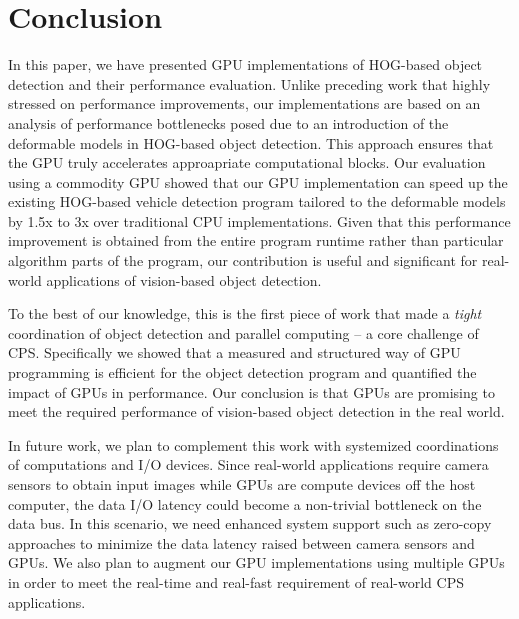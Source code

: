 \section{Conclusion}
\label{sec:conclusion}

In this paper, we have presented GPU implementations of HOG-based object
detection and their performance evaluation.
Unlike preceding work that highly stressed on performance improvements,
our implementations are based on an analysis of performance bottlenecks
posed due to an introduction of the deformable models in HOG-based
object detection.
This approach ensures that the GPU truly accelerates approapriate
computational blocks.
Our evaluation using a commodity GPU showed that our GPU implementation
can speed up the existing HOG-based vehicle detection program tailored
to the deformable models by 1.5x to 3x over traditional CPU
implementations.
Given that this performance improvement is obtained from the entire
program runtime rather than particular algorithm parts of the program,
our contribution is useful and significant for real-world applications
of vision-based object detection. 

To the best of our knowledge, this is the first piece of work that made
a \textit{tight} coordination of object detection and parallel computing
-- a core challenge of CPS.
Specifically we showed that a measured and structured way of GPU
programming is efficient for the object detection program and quantified
the impact of GPUs in performance.
Our conclusion is that GPUs are promising to meet the required
performance of vision-based object detection in the real world.

In future work, we plan to complement this work with systemized
coordinations of computations and I/O devices.
Since real-world applications require camera sensors to obtain input
images while GPUs are compute devices off the host computer, the data
I/O latency could become a non-trivial bottleneck on the data bus.
In this scenario, we need enhanced system support such as zero-copy
approaches \cite{Kato13} to minimize the data latency raised between
camera sensors and GPUs.
We also plan to augment our GPU implementations using multiple GPUs in
order to meet the real-time and real-fast requirement of real-world CPS
applications.
